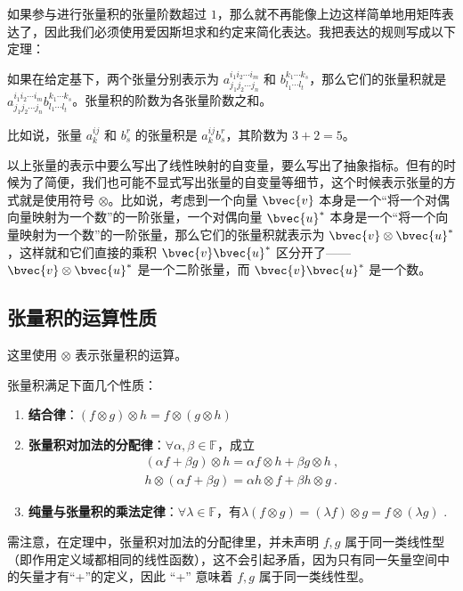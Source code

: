 如果参与进行张量积的张量阶数超过 $1$，那么就不再能像上边这样简单地用矩阵表达了，因此我们必须使用爱因斯坦求和约定来简化表达。我把表达的规则写成以下定理：

\begin{theorem}{}
如果在给定基下，两个张量分别表示为 $a^{i_1i_2\cdots i_m}_{j_1j_2\cdots j_n}$ 和 $b^{k_1\cdots k_s}_{l_1\cdots l_t}$，那么它们的张量积就是 $a^{i_1i_2\cdots i_m}_{j_1j_2\cdots j_n}b^{k_1\cdots k_s}_{l_1\cdots l_t}$。张量积的阶数为各张量阶数之和。
\end{theorem}

比如说，张量 $a^{ij}_k$ 和 $b^r_s$ 的张量积是 $a^{ij}_kb^r_s$，其阶数为 $3+2=5$。

以上张量的表示中要么写出了线性映射的自变量，要么写出了抽象指标。但有的时候为了简便，我们也可能不显式写出张量的自变量等细节，这个时候表示张量的方式就是使用符号 $\otimes$。比如说，考虑到一个向量 $\bvec{v}$ 本身是一个“将一个对偶向量映射为一个数”的一阶张量，一个对偶向量 $\bvec{u}^*$ 本身是一个“将一个向量映射为一个数”的一阶张量，那么它们的张量积就表示为 $\bvec{v}\otimes\bvec{u}^*$，这样就和它们直接的乘积 $\bvec{v}\bvec{u}^*$ 区分开了——$\bvec{v}\otimes\bvec{u}^*$ 是一个二阶张量，而 $\bvec{v}\bvec{u}^*$ 是一个数。

\subsection{张量积的运算性质}
这里使用 $\otimes$ 表示张量积的运算。
\begin{theorem}{}\label{the_TsrPrd_1}
张量积满足下面几个性质：
\begin{enumerate}
\item \textbf{结合律}：$(f\otimes g)\otimes h=f\otimes (g\otimes h)$
\item \textbf{张量积对加法的分配律}：$\forall \alpha,\beta\in\mathbb F$，成立
\begin{equation}
\begin{aligned}
(\alpha f+\beta g)\otimes h=\alpha f\otimes h+\beta g\otimes h~,\\
h\otimes(\alpha f+\beta g)=\alpha h\otimes f+\beta h\otimes g~.
\end{aligned}
\end{equation}
\item \textbf{纯量与张量积的乘法定律}：$\forall \lambda\in\mathbb F$，有$\lambda (f\otimes g)=(\lambda f)\otimes g=f\otimes (\lambda g)$ .
\end{enumerate}
\end{theorem}
需注意，在定理中，张量积对加法的分配律里，并未声明 $f,g$ 属于同一类线性型（即作用定义域都相同的线性函数），这不会引起矛盾，因为只有同一矢量空间中的矢量才有“+”的定义，因此 “+” 意味着 $f,g$ 属于同一类线性型。

